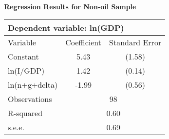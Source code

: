 \centering
\textbf{Regression Results for Non-oil Sample} \\
\begin{tabular}{lcc}
\hline
\multicolumn{3}{l}{Dependent variable: ln(GDP)} \\
\hline
Variable & Coefficient & Standard Error \\
\hline
Constant & 5.43 & (1.58) \\
ln(I/GDP) & 1.42 & (0.14) \\
ln(n+g+delta) & -1.99 & (0.56) \\
\hline
Observations & \multicolumn{2}{c}{98} \\
R-squared & \multicolumn{2}{c}{0.60} \\
s.e.e. & \multicolumn{2}{c}{0.69} \\
\hline
\end{tabular}
